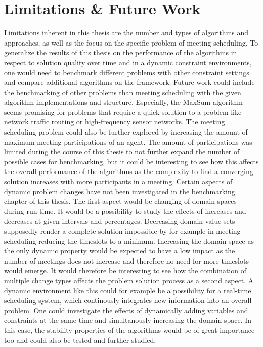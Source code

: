 \chapter{Limitations \& Future Work}
\label{c:limitations}
Limitations inherent in this thesis are the number and types of algorithms and approaches, as well as the focus on the specific problem of meeting scheduling. To generalize the results of this thesis on the performance of the algorithms in respect to solution quality over time and in a dynamic constraint environments, one would need to benchmark different problems with other constraint settings and compare additional algorithms on the framework. 
Future work could include the benchmarking of other problems than meeting scheduling with the given algorithm implementations and structure. Especially, the MaxSum algorithm seems promising for problems that require a quick solution to a problem like network traffic routing or high-frequency sensor networks. The meeting scheduling problem could also be further explored by increasing the amount of maximum meeting participations of an agent. The amount of participations was limited during the course of this thesis to not further expand the number of possible cases for benchmarking, but it could be interesting to see how this affects the overall performance of the algorithms as the complexity to find a converging solution increases with more participants in a meeting.
 \newline \newline
 Certain aspects of dynamic problem changes have not been investigated in the benchmarking chapter of this thesis. The first aspect would be changing of domain spaces during run-time. It would be a possibility to study the effects of  increases and decreases at given intervals and percentages. Decreasing domain value sets supposedly render a complete solution impossible by for example in meeting scheduling reducing the timeslots to a minimum.  Increasing the domain space as the only dynamic property would be expected to have a low impact as the number of meetings does not increase and therefore no need for more timeslots would emerge. It would therefore be interesting to see how the combination of multiple change types affects the problem solution process as a second aspect. A dynamic environment like this could for example be a possibility for a real-time scheduling system, which continously integrates new information into an overall problem. One could investigate the effects of dynamically adding variables and constraints at the same time and simultanously increasing the domain space. In this case, the stability properties of the algorithms would be of great importance too and could also be tested and further studied.
 

 